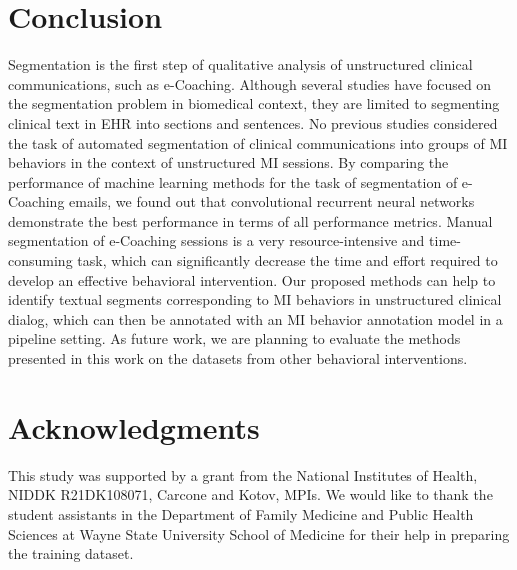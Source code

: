 \documentclass{amia}
\begin{document}
 
\section*{Conclusion}

Segmentation is the first step of qualitative analysis of unstructured clinical communications, such as e-Coaching. Although several studies have focused on the segmentation problem in biomedical context, they are limited to segmenting clinical text in EHR into sections and sentences. No previous studies considered the task of automated segmentation of clinical communications into groups of MI behaviors in the context of unstructured MI sessions. By comparing the performance of machine learning methods for the task of segmentation of e-Coaching emails, we found out that convolutional recurrent neural networks demonstrate the best performance in terms of all performance metrics. Manual segmentation of e-Coaching sessions is a very resource-intensive and time-consuming task, which can significantly decrease the time and effort required to develop an effective behavioral intervention. Our proposed methods can help to identify textual segments corresponding to MI behaviors in unstructured clinical dialog, which can then be annotated with an MI behavior annotation model in a pipeline setting. %
As future work, we are planning to evaluate the methods presented in this work on the datasets from other behavioral interventions.

\section*{Acknowledgments}
This study was supported by a grant from the National Institutes of Health, NIDDK R21DK108071, Carcone and Kotov, MPIs. We would like to thank the student assistants in the Department of Family Medicine and Public Health Sciences at Wayne State University School of Medicine for their help in preparing the training dataset. 



\end{document}
